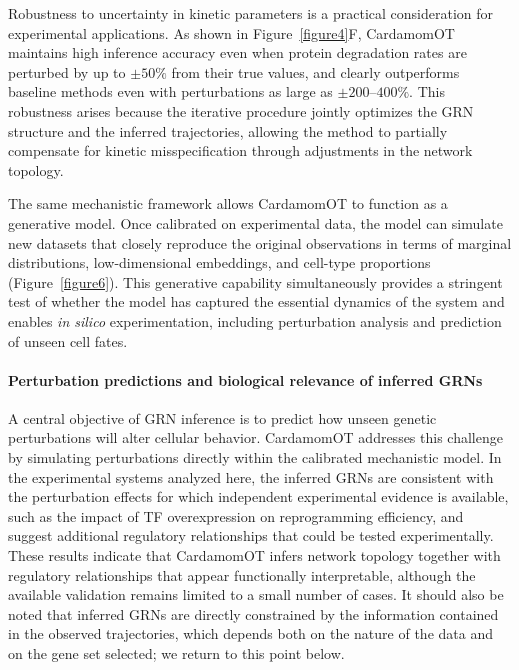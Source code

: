 \documentclass[a4paper, 11pt]{article}
\theoremstyle{plain}
\theoremstyle{remark}
\newcommand*{\firstreview}[1]{{\color{black}#1}}
\begin{document}
Robustness to uncertainty in kinetic parameters is a practical consideration for experimental applications. As shown in Figure~\ref{figure4}F, CardamomOT maintains high inference accuracy even when protein degradation rates are perturbed by up to $\pm 50\%$ from their true values, and clearly outperforms baseline methods even with perturbations as large as $\pm 200$--$400\%$. This robustness arises because the iterative procedure jointly optimizes the GRN structure and the inferred trajectories, allowing the method to partially compensate for kinetic misspecification through adjustments in the network topology.

The same mechanistic framework allows CardamomOT to function as a generative model. Once calibrated on experimental data, the model can simulate new datasets that closely reproduce the original observations in terms of marginal distributions, low-dimensional embeddings, and cell-type proportions (Figure~\ref{figure6}). This generative capability simultaneously provides a stringent test of whether the model has captured the essential dynamics of the system and enables \textit{in silico} experimentation, including perturbation analysis and prediction of unseen cell fates.

\paragraph{Perturbation predictions and biological relevance of inferred GRNs}
A central objective of GRN inference is to predict how unseen genetic perturbations
will alter cellular behavior. CardamomOT addresses this challenge by simulating
perturbations directly within the calibrated mechanistic model. In the experimental
systems analyzed here, the inferred GRNs \firstreview{are consistent with the
perturbation effects for which independent experimental evidence is available,} such as
the impact of \firstreview{TF} overexpression on reprogramming efficiency, and suggest
additional regulatory relationships that could be tested experimentally. These results
indicate that CardamomOT infers network topology \firstreview{together with regulatory
relationships that appear functionally interpretable, although the available validation
remains limited to a small number of cases.} \firstreview{It should also be noted that inferred GRNs are directly constrained by the information contained in the observed trajectories, which depends both on the nature of the data and on the gene set selected; we return to this point below.}
\end{document}
